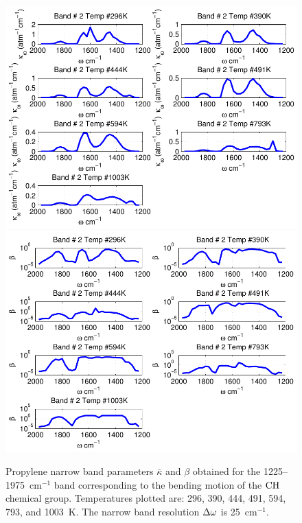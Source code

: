 \begin{figure}[p]
\begin{center}
\includegraphics[width=5.0in]{Figures/Propylene_Kappa_Band2_MALKMUS.pdf}
\includegraphics[width=5.0in]{Figures/Propylene_Beta_Band2_MALKMUS.pdf}
\end{center}
\caption{Propylene narrow band parameters $\bar{\kappa}$ and $\beta$ obtained for the 1225--1975~cm$^{-1}$ band corresponding to the bending motion of the $\rm CH$ chemical group. Temperatures plotted are: 296, 390, 444, 491, 594, 793, and 1003~K. The narrow band resolution $\Delta \omega$ is 25~cm$^{-1}$.\label{fig:propylene_kappa_beta2}}
\end{figure}

